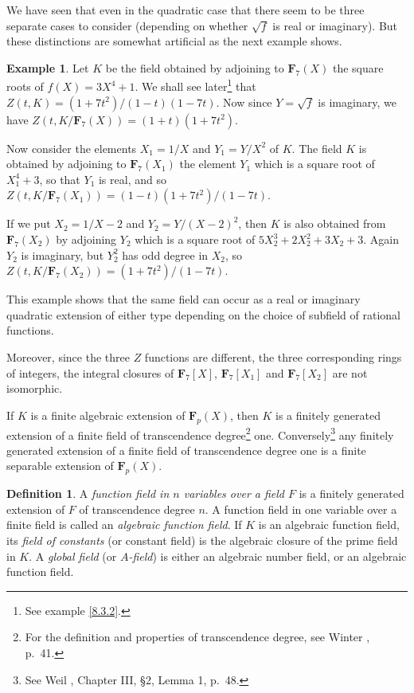 \documentclass[10pt,leqno]{article}
\theoremstyle{definition}
\newtheorem{defi}[theo]{Definition}
\newtheorem{exam}[theo]{Example}
\def\FF{\mathbf{F}}
\def\fnthth{See example \ref{8.3.2}.}
\def\fnthfo{For the definition and properties of transcendence degree, see Winter \cite{bib:217}, p.~41.}
\def\fnthfi{See Weil \cite{bib:214}, Chapter III, \S2, Lemma 1, p.~48.}
\begin{document}
We have seen that even in the quadratic case that there seem to be three separate cases to consider (depending on whether $\sqrt f$ is real or imaginary).
But these distinctions are somewhat artificial as the next example shows.


\begin{exam}
\label{3.5.6}
Let $K$ be the field obtained by adjoining to $\FF_7(X)$ the square roots of $f(X) = 3X^4 + 1$.
We shall see later\footnote{\fnthth} that $Z(t,K) = (1+7t^2)/(1-t)(1-7t)$.
Now since $Y = \sqrt f$ is imaginary, we have $Z(t,K/\FF_7(X)) = (1+t)(1+7t^2)$.

Now consider the elements $X_1 = 1/X$ and $Y_1 = Y/X^2$ of $K$.
The field $K$ is obtained by adjoining to $\FF_7(X_1)$ the element $Y_1$ which is a square root of $X_1^4 + 3$, so that $Y_1$ is real, and so $Z(t, K/\FF_7(X_1)) = (1-t)(1+7t^2)/(1-7t)$.

If we put $X_2 = 1/X-2$ and $Y_2 = Y/(X-2)^2$, then $K$ is also obtained from $\FF_7(X_2)$ by adjoining $Y_2$ which is a square root of $5X_2^3 + 2X_2^2 + 3X_2 + 3$.
Again $Y_2$ is imaginary, but $Y_2^2$ has odd degree in $X_2$, so $Z(t, K/\FF_7(X_2)) = (1+7t^2)/(1-7t)$.

This example shows that the same field can occur as a real or imaginary quadratic extension of either type depending on the choice of subfield of rational functions.

Moreover, since the three $Z$ functions are different, the three corresponding rings of integers, the integral closures of $\FF_7[X]$, $\FF_7[X_1]$ and $\FF_7[X_2]$ are not isomorphic.
\end{exam}

If $K$ is a finite algebraic extension of $\FF_p(X)$, then $K$ is a finitely generated extension of a finite field of transcendence degree\footnote{\fnthfo} one.
Conversely\footnote{\fnthfi} any finitely generated extension of a finite field of transcendence degree one is a finite separable extension of $\FF_p(X)$.


\begin{defi}
\label{3.5.7}
A \emph{function field in $n$ variables over a field $F$} is a finitely generated extension of $F$ of transcendence degree $n$.
A function field in one variable over a finite field is called an \emph{algebraic function field}.
If $K$ is an algebraic function field, its \emph{field of constants} (or constant field) is the algebraic closure of the prime field in $K$.
A \emph{global field} (or \emph{$A$-field}) is either an algebraic number field, or an algebraic function field.
\end{defi}
\end{document}

